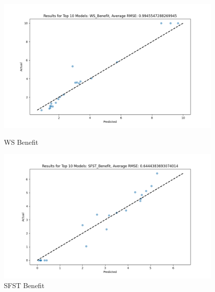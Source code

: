 \begin{figure}[H]
    \centering
    \begin{minipage}{0.495\textwidth}
        \centering
        \includegraphics[width=\linewidth]{reg_section_all/images_reg_ensemble/ensemble_learning_rmse_plot_top_10_Models_WS_Benefit.png}
        \caption{WS Benefit}
        \label{fig:ws_ben_ensemble}
    \end{minipage}\hfill
    \begin{minipage}{0.495\textwidth}
        \centering
        \includegraphics[width=\linewidth]{reg_section_all/images_reg_ensemble/ensemble_learning_rmse_plot_top_10_Models_SFST_Benefit.png}
        \caption{SFST Benefit}
        \label{fig:sfst_ben_ensemble}
    \end{minipage}
\end{figure}